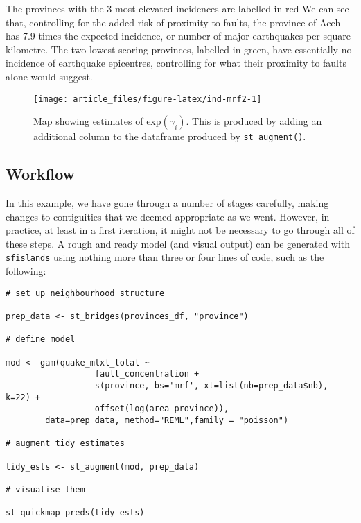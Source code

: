 The provinces with the 3 most elevated incidences are labelled in red
We can see that, controlling for the added risk of proximity to
faults, the province of Aceh has 7.9 times the expected
incidence, or number of major earthquakes per square kilometre. The two
lowest-scoring provinces, labelled in green, have essentially no incidence of
earthquake epicentres, controlling for what their proximity to faults alone would
suggest.



\begin{figure}

{\centering \texttt{[image: article\_files/figure-latex/ind-mrf2-1]} 

}

\caption{Map showing estimates of \(\text{exp}(\gamma_i).\) This is produced by adding an additional column to the dataframe produced by \texttt{st\_augment()}.}\label{fig:ind-mrf2}
\end{figure}

\hypertarget{workflow}{%
\subsection{Workflow}\label{workflow}}

In this example, we have gone through a number of stages carefully, making changes to contiguities that we deemed appropriate as we went. However, in practice, at least in a first iteration, it might not be necessary to go through all of these steps. A rough and ready model (and visual output) can be generated with \texttt{sfislands} using nothing more than three or four lines of code, such as the following:

\begin{verbatim}
# set up neighbourhood structure

prep_data <- st_bridges(provinces_df, "province")

# define model

mod <- gam(quake_mlxl_total ~ 
                  fault_concentration +
                  s(province, bs='mrf', xt=list(nb=prep_data$nb), k=22) +
                  offset(log(area_province)),
        data=prep_data, method="REML",family = "poisson")

# augment tidy estimates

tidy_ests <- st_augment(mod, prep_data)

# visualise them

st_quickmap_preds(tidy_ests)
\end{verbatim}

